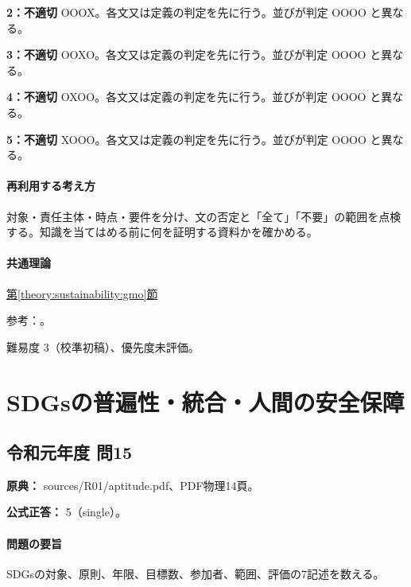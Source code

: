 \noindent\textbf{2：不適切} OOOX。各文又は定義の判定を先に行う。並びが判定 OOOO と異なる。\par

\noindent\textbf{3：不適切} OOXO。各文又は定義の判定を先に行う。並びが判定 OOOO と異なる。\par

\noindent\textbf{4：不適切} OXOO。各文又は定義の判定を先に行う。並びが判定 OOOO と異なる。\par

\noindent\textbf{5：不適切} XOOO。各文又は定義の判定を先に行う。並びが判定 OOOO と異なる。\par

\paragraph{再利用する考え方} 対象・責任主体・時点・要件を分け、文の否定と「全て」「不要」の範囲を点検する。知識を当てはめる前に何を証明する資料かを確かめる。

\paragraph{共通理論} \hyperref[theory:sustainability:gmo]{第\ref*{theory:sustainability:gmo}節}

\par 参考：\cite{saf53_cartagena,saf53_gmo_food2004,saf53_gmo_standards2000}。

\par 難易度 3（校準初稿）、優先度未評価。

\section{SDGsの普遍性・統合・人間の安全保障}

\subsection{令和元年度 問15}
\label{q:r01-reg-apt-15}

\noindent\textbf{原典：} sources/R01/aptitude.pdf、PDF物理14頁。

\textbf{公式正答：} 5（single）。

\paragraph{問題の要旨} SDGsの対象、原則、年限、目標数、参加者、範囲、評価の7記述を数える。

